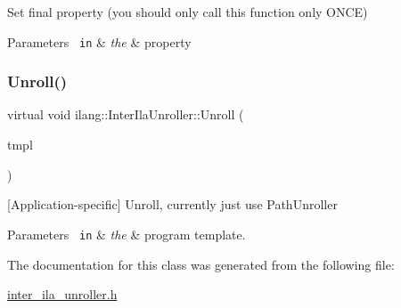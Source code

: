 Set final property (you should only call this function only O\+N\+CE) 


\begin{DoxyParams}[1]{Parameters}
\mbox{\texttt{ in}}  & {\em the} & property \\
\hline
\end{DoxyParams}
\mbox{\label{classilang_1_1_inter_ila_unroller_ac56ad07cf9d03caa3f1fb10091779dc0}} 
\subsubsection{\texorpdfstring{Unroll()}{Unroll()}}
{\footnotesize\ttfamily virtual void ilang\+::\+Inter\+Ila\+Unroller\+::\+Unroll (\begin{DoxyParamCaption}\item[{const \mbox{\hyperlink{classilang_1_1_inter_ila_unroller_acc24c6ee17b58b05e18882d73c5affde}{Program\+Template}} \&}]{tmpl }\end{DoxyParamCaption})\hspace{0.3cm}{\ttfamily [virtual]}}



\mbox{[}Application-\/specific\mbox{]} Unroll, currently just use Path\+Unroller 


\begin{DoxyParams}[1]{Parameters}
\mbox{\texttt{ in}}  & {\em the} & program template. \\
\hline
\end{DoxyParams}


The documentation for this class was generated from the following file\+:\begin{DoxyCompactItemize}
\item 
\mbox{\hyperlink{inter__ila__unroller_8h}{inter\+\_\+ila\+\_\+unroller.\+h}}\end{DoxyCompactItemize}
